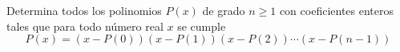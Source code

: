 Determina todos los polinomios $P(x)$ de grado $n \geq 1$ con coeficientes enteros tales que para todo número real $x$ se cumple
\[ P(x) = (x - P(0))(x - P(1))(x - P(2)) \cdots (x - P(n-1)) \]

